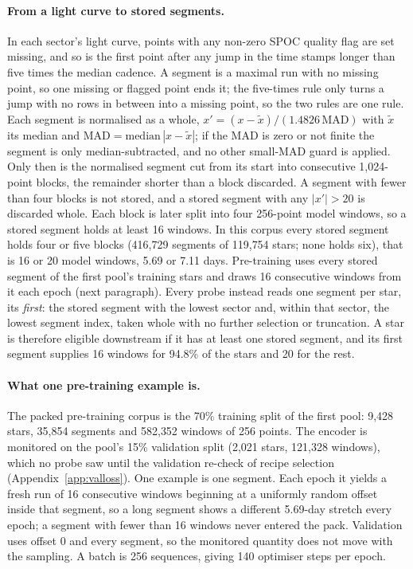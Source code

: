 \documentclass{article}
\begin{document}
\paragraph{From a light curve to stored segments.} In each sector's light curve, points with any
non-zero SPOC quality flag are set missing, and so is the first point after any jump in the time
stamps longer than five times the median cadence. A segment is a maximal run with no
missing point, so one missing or flagged point ends it; the five-times rule only turns a jump
with no rows in between into a missing point, so the two rules are one rule. Each segment is normalised
as a whole, $x' = (x - \tilde{x}) / (1.4826\,\mathrm{MAD})$ with $\tilde{x}$ its median and
$\mathrm{MAD} = \mathrm{median}\,|x - \tilde{x}|$; if the MAD is zero or not finite the segment is
only median-subtracted, and no other small-MAD guard is applied. Only then is the normalised segment
cut from its start into consecutive 1{,}024-point blocks, the remainder shorter than a block
discarded. A segment with fewer than four blocks is not stored, and a stored segment with any
$|x'| > 20$ is discarded whole. Each block is later split into four 256-point model windows, so a
stored segment holds at least 16 windows. In this corpus every stored segment holds four or five
blocks (416{,}729 segments of 119{,}754 stars; none holds six), that is 16 or 20 model windows,
5.69 or 7.11 days. Pre-training uses every stored segment of the first pool's training stars and
draws 16 consecutive windows from it each epoch (next paragraph). Every probe instead reads one
segment per star, its \emph{first}: the stored segment with the lowest sector and, within that
sector, the lowest segment index, taken whole with no further selection or truncation. A star is
therefore eligible downstream if it has at least one stored segment, and its first segment supplies
16 windows for 94.8\% of the stars and 20 for the rest.

\paragraph{What one pre-training example is.} The packed pre-training corpus is the 70\% training
split of the first pool: 9{,}428 stars, 35{,}854 segments and 582{,}352 windows of 256 points. The
encoder is monitored on the pool's 15\% validation split (2{,}021 stars, 121{,}328 windows), which no
probe saw until the validation re-check of recipe selection (Appendix~\ref{app:valloss}). One example is one segment. Each epoch it yields a fresh run of 16 consecutive
windows beginning at a uniformly random offset inside that segment, so a long segment shows a
different 5.69-day stretch every epoch; a segment with fewer than 16 windows never entered the pack.
Validation uses offset 0 and every segment, so the monitored quantity does not move with the
sampling. A batch is 256 sequences, giving 140 optimiser steps per epoch.
\end{document}
